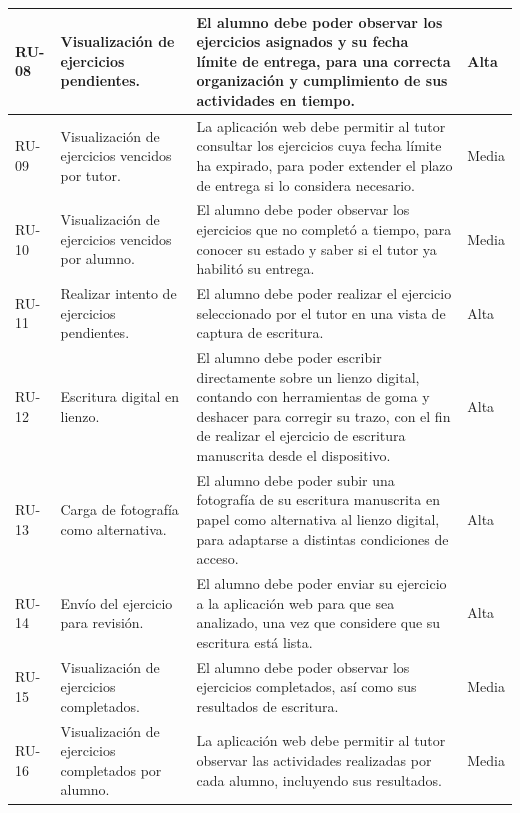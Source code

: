 \begin{longtable}{|>{\centering\arraybackslash}m{2cm}|m{3.6cm}|
  Y{\dimexpr\textwidth-7.6cm-8\arrayrulewidth\relax}|
  >{\centering\arraybackslash}m{2cm}|}
RU-08 &
Visualización de ejercicios pendientes. &
El alumno debe poder observar los ejercicios asignados y su fecha límite de entrega, para una correcta organización y cumplimiento de sus actividades en tiempo. &
Alta \\
\hline

RU-09 &
Visualización de ejercicios vencidos por tutor. &
La aplicación web debe permitir al tutor consultar los ejercicios cuya fecha límite ha expirado, para poder extender el plazo de entrega si lo considera necesario. &
Media \\
\hline

RU-10 &
Visualización de ejercicios vencidos por alumno. &
El alumno debe poder observar los ejercicios que no completó a tiempo, para conocer su estado y saber si el tutor ya habilitó su entrega. &
Media \\
\hline

RU-11 &
Realizar intento de ejercicios pendientes. &
El alumno debe poder realizar el ejercicio seleccionado por el tutor en una vista de captura de escritura. &
Alta \\
\hline

RU-12 &
Escritura digital en lienzo. &
El alumno debe poder escribir directamente sobre un lienzo digital, contando con herramientas de goma y deshacer para corregir su trazo, con el fin de realizar el ejercicio de escritura manuscrita desde el dispositivo. &
Alta \\
\hline

RU-13 &
Carga de fotografía como alternativa. &
El alumno debe poder subir una fotografía de su escritura manuscrita en papel como alternativa al lienzo digital, para adaptarse a distintas condiciones de acceso. &
Alta \\
\hline

RU-14 &
Envío del ejercicio para revisión. &
El alumno debe poder enviar su ejercicio a la aplicación web para que sea analizado, una vez que considere que su escritura está lista. &
Alta \\
\hline

RU-15 &
Visualización de ejercicios completados. &
El alumno debe poder observar los ejercicios completados, así como sus resultados de escritura. &
Media \\
\hline

RU-16 &
Visualización de ejercicios completados por alumno. &
La aplicación web debe permitir al tutor observar las actividades realizadas por cada alumno, incluyendo sus resultados. &
Media \\
\hline


\end{longtable}
